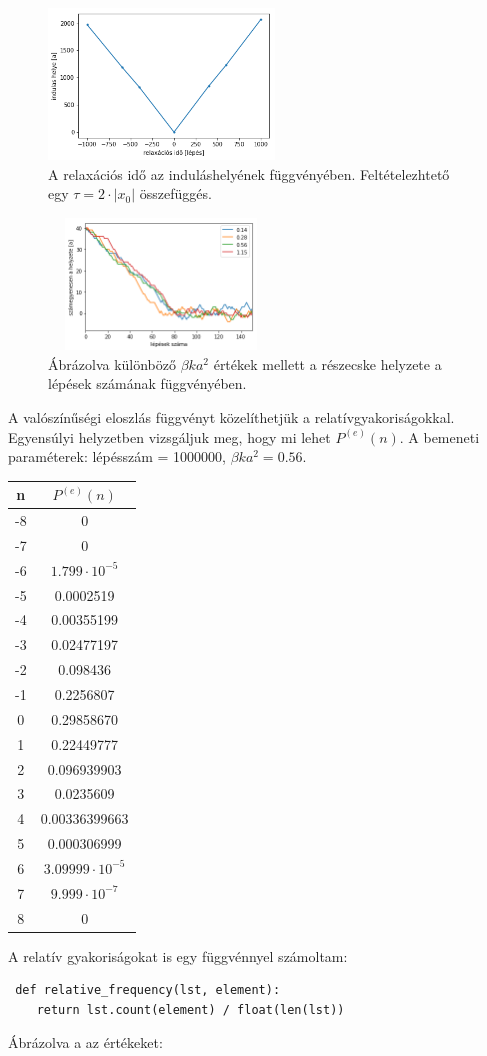 \documentclass[12pt]{article}
\begin{document}
\begin{figure}[H]
\centering
\includegraphics[width = 60mm]{relax}
\caption{A relaxációs idő az induláshelyének függvényében. Feltételezhtető egy $\tau = 2\cdot | x_0|$ összefüggés.}
\end{figure}
\begin{figure}[H]
\centering
\includegraphics[width = 60mm, height = 35mm]{all.png}
\caption{Ábrázolva különböző $\beta ka^2$ értékek mellett a részecske helyzete a lépések számának függvényében.}
\end{figure}

A valószínűségi eloszlás függvényt közelíthetjük a relatívgyakoriságokkal. Egyensúlyi helyzetben vizsgáljuk meg, hogy mi lehet $P^{(e)}(n)$. A bemeneti paraméterek: lépésszám = 1000000, $\beta ka^2 = 0.56$.
\begin{center}
\begin{tabular}{ |c|c|}
\hline
 n&$P^{(e)}(n)$ \\ \hline
 -8& 0\\ \hline
-7&0\\ \hline
-6&$1.799\cdot 10^{-5}$ \\ \hline
-5&0.0002519 \\ \hline
-4&0.00355199\\ \hline
-3&0.02477197\\ \hline
-2& 0.098436 \\ \hline
-1&0.2256807\\ \hline
0& 0.29858670 \\ \hline
1& 0.22449777 \\ \hline
2&0.096939903 \\ \hline
3&0.0235609 \\ \hline
4& 0.00336399663\\ \hline
5&0.000306999\\ \hline
6&$3.09999\cdot 10^{-5}$\\ \hline
7&$9.999\cdot 10^{-7}$\\ \hline
8& 0\\ \hline

\end{tabular}
\end{center}
\newpage
 A relatív gyakoriságokat is egy függvénnyel számoltam:
 \begin{lstlisting}
 def relative_frequency(lst, element):
    return lst.count(element) / float(len(lst))
 \end{lstlisting}
Ábrázolva a az értékeket:
\end{document}
